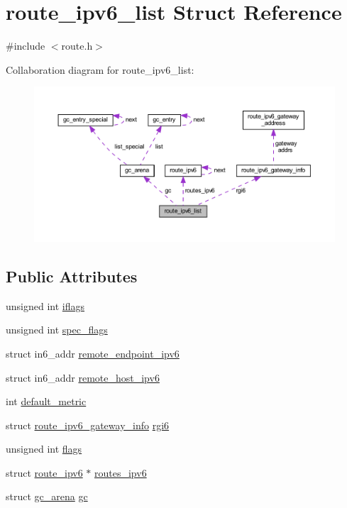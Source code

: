 \hypertarget{structroute__ipv6__list}{}\section{route\+\_\+ipv6\+\_\+list Struct Reference}
\label{structroute__ipv6__list}


{\ttfamily \#include $<$route.\+h$>$}



Collaboration diagram for route\+\_\+ipv6\+\_\+list\+:
\nopagebreak
\begin{figure}[H]
\begin{center}
\leavevmode
\includegraphics[width=350pt]{structroute__ipv6__list__coll__graph}
\end{center}
\end{figure}
\subsection*{Public Attributes}
\begin{DoxyCompactItemize}
\item 
unsigned int \hyperlink{structroute__ipv6__list_a21ed5214406a04ca1f9ae50a5b8baa30}{iflags}
\item 
unsigned int \hyperlink{structroute__ipv6__list_aba4d0c00a2776bbf56962b5f91270975}{spec\+\_\+flags}
\item 
struct in6\+\_\+addr \hyperlink{structroute__ipv6__list_af309b93a54952c1ad1c90a3524500a8a}{remote\+\_\+endpoint\+\_\+ipv6}
\item 
struct in6\+\_\+addr \hyperlink{structroute__ipv6__list_aceafdf9eedadcb6120bf3bad2db4cf62}{remote\+\_\+host\+\_\+ipv6}
\item 
int \hyperlink{structroute__ipv6__list_ace041f684c00422ff74cf78ae63f91e0}{default\+\_\+metric}
\item 
struct \hyperlink{structroute__ipv6__gateway__info}{route\+\_\+ipv6\+\_\+gateway\+\_\+info} \hyperlink{structroute__ipv6__list_a35c2e69d66cdd0e1747dde14bfbeafcf}{rgi6}
\item 
unsigned int \hyperlink{structroute__ipv6__list_a2b456407184fd139a34ddbde6b10dc67}{flags}
\item 
struct \hyperlink{structroute__ipv6}{route\+\_\+ipv6} $\ast$ \hyperlink{structroute__ipv6__list_a5675a79731f35a5b035b1231089970b9}{routes\+\_\+ipv6}
\item 
struct \hyperlink{structgc__arena}{gc\+\_\+arena} \hyperlink{structroute__ipv6__list_af181ea8e63bdbec005431ac6777f98b8}{gc}
\end{DoxyCompactItemize}


